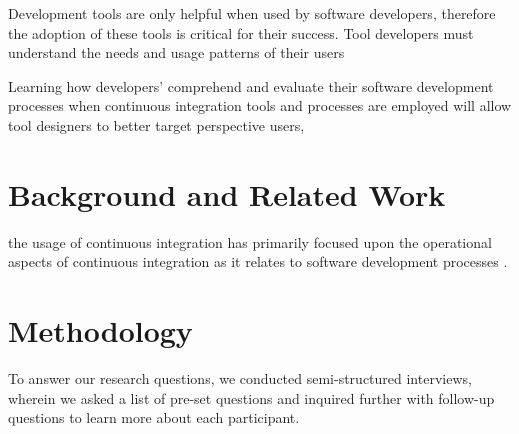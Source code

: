 \documentclass{sig-alternate}
\begin{document}
Development tools are only helpful when used by software developers, therefore the adoption of these tools is critical for their success. Tool developers must understand the needs and usage patterns of their users

Learning how developers' comprehend and evaluate their software development processes when continuous integration tools and processes are employed will allow tool designers to better target perspective users, 

\section{Background and Related Work}

the usage of continuous integration has primarily focused upon the operational aspects of continuous integration as it relates to software development processes \cite{miller:hundreddays}\cite{olsson:climbingstairway}.

\section{Methodology}
To answer our research questions, we conducted semi-structured interviews, wherein we asked a list of pre-set questions and inquired further with follow-up questions to learn more about each participant. \\
\end{document}
